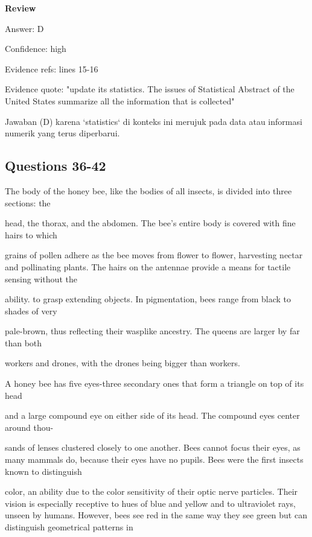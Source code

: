 \documentclass[12pt]{article}
\begin{document}
\par
\begingroup
\setlength{\parskip}{0pt}
\setlength{\parindent}{0pt}
\textbf{Review}\par
Answer: D\par
Confidence: high\par
Evidence refs: lines 15-16\par
Evidence quote: "update its statistics. The issues of Statistical Abstract of the United States summarize all the information that is collected"\par
Jawaban (D) karena `statistics` di konteks ini merujuk pada data atau informasi numerik yang terus diperbarui.\par
\endgroup
\par
\vspace{0.25\baselineskip}
\subsection*{Questions 36-42}
\begingroup
\small
\sloppy
\setlength{\parskip}{0pt}
\setlength{\parindent}{0pt}
The body of the honey bee, like the bodies of all insects, is divided into three sections: the\par
head, the thorax, and the abdomen. The bee's entire body is covered with fine hairs to which\par
grains of pollen adhere as the bee moves from flower to flower, harvesting nectar and pollinating plants. The hairs on the antennae provide a means for tactile sensing without the\par
ability. to grasp extending objects. In pigmentation, bees range from black to shades of very\par
pale-brown, thus reflecting their wasplike ancestry. The queens are larger by far than both\par
workers and drones, with the drones being bigger than workers.\par
A honey bee has five eyes-three secondary ones that form a triangle on top of its head\par
and a large compound eye on either side of its head. The compound eyes center around thou-\par
sands of lenses clustered closely to one another. Bees cannot focus their eyes, as many mammals do, because their eyes have no pupils. Bees were the first insects known to distinguish\par
color, an ability due to the color sensitivity of their optic nerve particles. Their vision is especially receptive to hues of blue and yellow and to ultraviolet rays, unseen by humans. However, bees see red in the same way they see green but can distinguish geometrical patterns in\par
\end{document}
